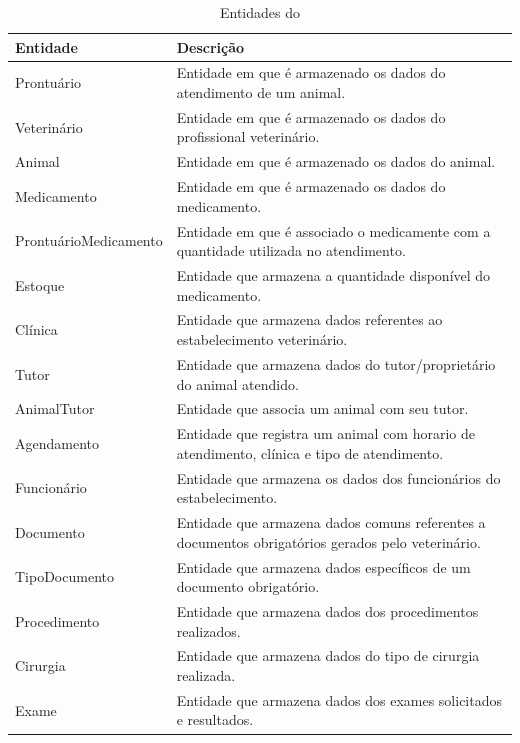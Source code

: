 \documentclass[
    12pt,               %
    openright,          %
    oneside,
    a4paper,            %
    BIBLATEX,           %
    TODO,               %
    english,            %
    brazil              %
    ]{ifsp-spo-inf-ctds}
\begin{document}
            \begin{center}
                \begin{table}[H]
                \centering
                \caption{Entidades do  }
                \begin{tabulary}{1.0\textwidth}{|p{10em}|p{26em}|}
                \hline
                Entidade & Descrição\\
                \hline
                Prontuário & Entidade em que é armazenado os dados do atendimento de um animal. \\
                \hline
                Veterinário & Entidade em que é armazenado os dados do profissional veterinário.\\
                \hline
                Animal & Entidade em que é armazenado os dados do animal.\\
                \hline
                Medicamento & Entidade em que é armazenado os dados do medicamento.\\
                \hline
                ProntuárioMedicamento & Entidade em que é associado o medicamente com a quantidade utilizada no atendimento.\\
                \hline
                Estoque & Entidade que armazena a quantidade disponível do medicamento.\\
                \hline
                Clínica & Entidade que armazena dados referentes ao estabelecimento veterinário.\\
                \hline
                Tutor & Entidade que armazena dados do tutor/proprietário do animal atendido.\\
                \hline
                AnimalTutor & Entidade que associa um animal com seu tutor.\\
                \hline
                Agendamento & Entidade que registra um animal com horario de atendimento, clínica e tipo de atendimento.\\
                \hline
                Funcionário & Entidade que armazena os dados dos funcionários do estabelecimento.\\
                \hline
                Documento & Entidade que armazena dados comuns referentes a documentos obrigatórios gerados pelo veterinário.\\
                \hline
                TipoDocumento & Entidade que armazena dados específicos de um documento obrigatório.\\
                \hline
                Procedimento & Entidade que armazena dados dos procedimentos realizados.\\
                \hline
                Cirurgia & Entidade que armazena dados do tipo de cirurgia realizada.\\
                \hline
                Exame & Entidade que armazena dados dos exames solicitados e resultados.\\
                \hline
                \end{tabulary}
                 
                \label{tab: entidades}
                \end{table}
            \end{center}
\end{document}
